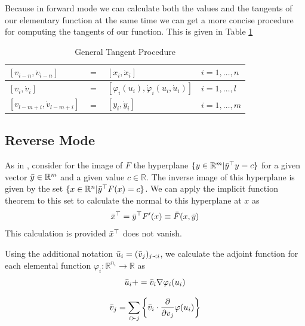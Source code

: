 \documentclass{article}
\begin{document}
Because in forward mode we can calculate both the values and the tangents of our elementary function at the same time we can get a more concise procedure for computing the tangents of our function. This is given in Table \ref{tab:gtp}

\begin{table}[h]
    \centering
    \begin{tabular}{|lcll|}
        \hline
        $[v_{i-n}, \Dot{v}_{i-n}]$ & $=$ & $[x_{i}, \Dot{x}_{i}]$ & $i = 1, \ldots, n$ \\
        \hline
        $[v_{i}, \Dot{v}_{i}]$ & $=$ & $[\varphi_i (u_i), \Dot{\varphi}_i(u_i, \Dot{u}_i)]$ & $i = 1, \ldots, l$ \\
        \hline
        $[v_{l-m+i}, \Dot{v}_{l-m+i}]$ & $=$ & $[y_{i}, \Dot{y}_{i}]$ & $i = 1, \ldots, m$ \\
        \hline
    \end{tabular}
    \caption{General Tangent Procedure}
    \label{tab:gtp}
\end{table}

\subsection{Reverse Mode}

As in \cite{dhamarticle}, consider for the image of $F$ the hyperplane $\{ y \in \mathbb{R}^m | \Bar{y}^\top y = c\}$ for a given vector $\Bar{y} \in \mathbb{R}^m$ and a given value $c \in \mathbb{R}$. The inverse image of this hyperplane is given by the set $\{ x \in \mathbb{R}^n | \Bar{y}^\top F(x) = c\}$. We can apply the implicit function theorem to this set to calculate the normal to this hyperplane at $x$ as
\begin{equation}
    \Bar{x}^\top = \Bar{y}^\top F'(x) \equiv \Bar{F}(x, \Bar{y})
\end{equation}
This calculation is provided $\Bar{x}^\top$ does not vanish.

Using the additional notation $\Bar{u}_i = (\Bar{v}_j)_{j \prec i}$, we calculate the adjoint function for each elemental function $\varphi_i : \mathbb{R}^{n_i} \longrightarrow \mathbb{R}$ as
\begin{equation}
    \Bar{u}_i += \Bar{v}_i \nabla \varphi_i (u_i)
\end{equation}

\begin{equation}
    \Bar{v}_j = \sum_{i \succ j} \left\{ \Bar{v}_i \cdot \frac{\partial}{\partial v_j} \varphi(u_i) \right\}
\end{equation}
\end{document}

